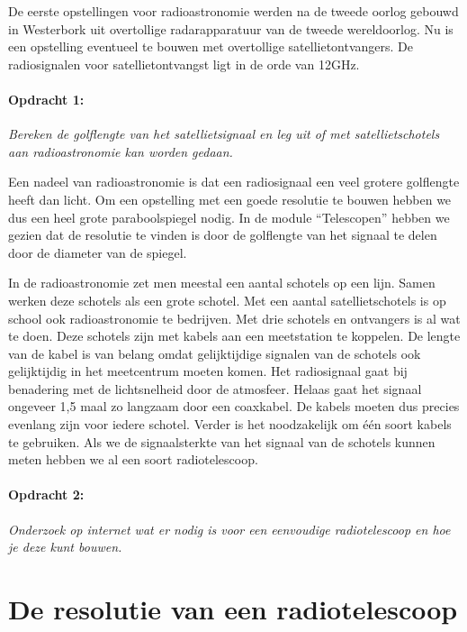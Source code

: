 De eerste opstellingen voor radioastronomie werden na de tweede oorlog
gebouwd in Westerbork uit overtollige radarapparatuur van de tweede
wereldoorlog. Nu is een opstelling eventueel te bouwen met overtollige
satellietontvangers. De radiosignalen voor satellietontvangst ligt
in de orde van 12GHz.


\paragraph*{Opdracht 1:}

\emph{Bereken de golflengte van het satellietsignaal en leg uit of
met satellietschotels aan radioastronomie kan worden gedaan.}

Een nadeel van radioastronomie is dat een radiosignaal een veel grotere
golflengte heeft dan licht. Om een opstelling met een goede resolutie
te bouwen hebben we dus een heel grote paraboolspiegel nodig. In de
module ``Telescopen'' hebben we gezien dat de resolutie te vinden
is door de golflengte van het signaal te delen door de diameter van
de spiegel.

In de radioastronomie zet men meestal een aantal schotels op een lijn.
Samen werken deze schotels als een grote schotel. Met een aantal satellietschotels
is op school ook radioastronomie te bedrijven. Met drie schotels en
ontvangers is al wat te doen. Deze schotels zijn met kabels aan een
meetstation te koppelen. De lengte van de kabel is van belang omdat
gelijktijdige signalen van de schotels ook gelijktijdig in het meetcentrum
moeten komen. Het radiosignaal gaat bij benadering met de lichtsnelheid
door de atmosfeer. Helaas gaat het signaal ongeveer 1,5 maal zo langzaam
door een coaxkabel. De kabels moeten dus precies evenlang zijn voor
iedere schotel. Verder is het noodzakelijk om één soort kabels te
gebruiken. Als we de signaalsterkte van het signaal van de schotels
kunnen meten hebben we al een soort radiotelescoop.


\paragraph*{Opdracht 2:}

\emph{Onderzoek op internet wat er nodig is voor een eenvoudige radiotelescoop
en hoe je deze kunt bouwen.}


\section{De resolutie van een radiotelescoop}

